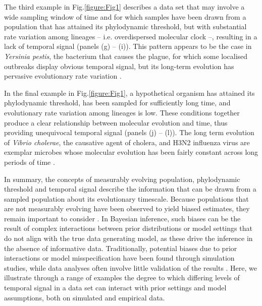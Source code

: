 \documentclass[11pt]{article}
\begin{document}
The third example in Fig.\ref{figure:Fig1} describes a data set that may involve a wide sampling window of time and for which samples have been drawn from a population that has attained its phylodynamic threshold, but with substantial rate variation among lineages – i.e. overdispersed molecular clock –, resulting in a lack of temporal signal (panels (g) – (i)). This pattern appears to be the case in \textit{Yersinia pestis}, the bacterium that causes the plague, for which some localised outbreaks display obvious temporal signal, but its long-term evolution has pervasive evolutionary rate variation \citep{eaton2023plagued, andrades2022stone}. 

In the final example in Fig.\ref{figure:Fig1}, a hypothetical organism has attained its phylodynamic threshold, has been sampled for sufficiently long time, and evolutionary rate variation among lineages is low. These conditions together produce a clear relationship between molecular evolution and time, thus providing unequivocal temporal signal (panels (j) – (l)). The long term evolution of \textit{Vibrio cholerae}, the causative agent of cholera, and H3N2 influenza virus are exemplar microbes whose molecular evolution has been fairly constant across long periods of time \citep{devault2014second, rambaut2016exploring}.

In summary, the concepts of measurably evolving population, phylodynamic threshold and temporal signal describe the information that can be drawn from a sampled population about its evolutionary timescale. Because populations that are not measurably evolving have been observed to yield biased estimates, they remain important to consider \citep{gharbi2024clock}. In Bayesian inference, such biases can be the result of complex interactions between prior distributions or model settings that do not align with the true data generating model, as these drive the inference in the absence of informative data. Traditionally, potential biases due to prior interactions \citep{tay2024assessing} or model misspecification \citep{moller2018impact} have been found through simulation studies, while data analyses often involve little validation of the results \citep{mendes2025validate}. Here, we illustrate through a range of examples the degree to which differing levels of temporal signal in a data set can interact with prior settings and model assumptions, both on simulated and empirical data.
\end{document}
